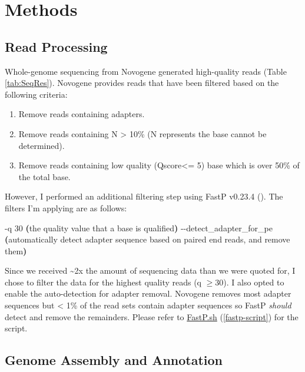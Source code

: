 \documentclass[
]{book}
\newenvironment{Shaded}{\begin{snugshade}}{\end{snugshade}}
\newcommand{\ErrorTok}[1]{\textcolor[rgb]{0.64,0.00,0.00}{\textbf{#1}}}
\newcommand{\ExtensionTok}[1]{#1}
\newcommand{\KeywordTok}[1]{\textcolor[rgb]{0.13,0.29,0.53}{\textbf{#1}}}
\newcommand{\NormalTok}[1]{#1}
\begin{document}
\chapter{Methods}\label{methods}

\section{Read Processing}\label{read-processing}

Whole-genome sequencing from Novogene generated high-quality reads (Table \ref{tab:SeqRes}). Novogene provides reads that have been filtered based on the following criteria:

\begin{enumerate}
\def\labelenumi{(\arabic{enumi})}
\item
  Remove reads containing adapters.
\item
  Remove reads containing N \textgreater{} 10\% (N represents the base cannot be determined).
\item
  Remove reads containing low quality (Qscore\textless= 5) base which is over 50\% of the total base.
\end{enumerate}

However, I performed an additional filtering step using FastP v0.23.4 (\citet{chen2018}). The filters I'm applying are as follows:

\begin{Shaded}
\begin{Highlighting}[]
\ExtensionTok{{-}q}\NormalTok{ 30 }\ErrorTok{(}\ExtensionTok{the}\NormalTok{ quality value that a base is qualified}\KeywordTok{)}
\ExtensionTok{{-}{-}detect\_adapter\_for\_pe} \ErrorTok{(}\ExtensionTok{automatically}\NormalTok{ detect adapter sequence based on paired end reads, and remove them}\KeywordTok{)}
\end{Highlighting}
\end{Shaded}

Since we received \textasciitilde2x the amount of sequencing data than we were quoted for, I chose to filter the data for the highest quality reads (q \(\geq 30\)). I also opted to enable the auto-detection for adapter removal. Novogene removes most adapter sequences but \textless{} 1\% of the read sets contain adapter sequences so FastP \emph{should} detect and remove the remainders. Please refer to \hyperref[fastp-script]{FastP.sh} (\ref{fastp-script}) for the script.

\section{Genome Assembly and Annotation}\label{genome-assembly-and-annotation}
\end{document}
